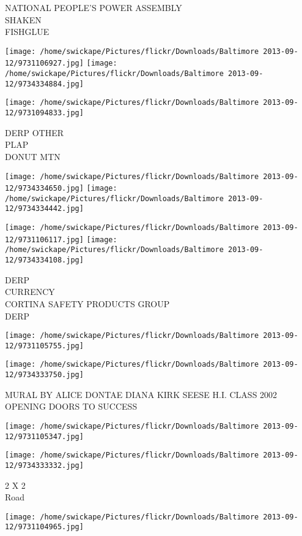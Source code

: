 \documentclass[10pt,letterpaper]{article}
\begin{document}
NATIONAL PEOPLE'S POWER ASSEMBLY\\
SHAKEN\\
FISHGLUE
\pagebreak

\texttt{[image: /home/swickape/Pictures/flickr/Downloads/Baltimore 2013-09-12/9731106927.jpg]}
\texttt{[image: /home/swickape/Pictures/flickr/Downloads/Baltimore 2013-09-12/9734334884.jpg]}

\vspace{0.25in}
\texttt{[image: /home/swickape/Pictures/flickr/Downloads/Baltimore 2013-09-12/9731094833.jpg]}

DERP OTHER\\
PLAP\\
DONUT MTN
\pagebreak

\texttt{[image: /home/swickape/Pictures/flickr/Downloads/Baltimore 2013-09-12/9734334650.jpg]}
\texttt{[image: /home/swickape/Pictures/flickr/Downloads/Baltimore 2013-09-12/9734334442.jpg]}

\texttt{[image: /home/swickape/Pictures/flickr/Downloads/Baltimore 2013-09-12/9731106117.jpg]}
\texttt{[image: /home/swickape/Pictures/flickr/Downloads/Baltimore 2013-09-12/9734334108.jpg]}

DERP\\
CURRENCY\\
CORTINA SAFETY PRODUCTS GROUP\\
DERP
\pagebreak

\texttt{[image: /home/swickape/Pictures/flickr/Downloads/Baltimore 2013-09-12/9731105755.jpg]}

\vspace{0.25in}
\texttt{[image: /home/swickape/Pictures/flickr/Downloads/Baltimore 2013-09-12/9734333750.jpg]}

MURAL BY ALICE DONTAE DIANA KIRK SEESE H.I. CLASS 2002\\
OPENING DOORS TO SUCCESS
\pagebreak

\texttt{[image: /home/swickape/Pictures/flickr/Downloads/Baltimore 2013-09-12/9731105347.jpg]}

\vspace{0.25in}
\texttt{[image: /home/swickape/Pictures/flickr/Downloads/Baltimore 2013-09-12/9734333332.jpg]}

2 X 2\\
Road
\pagebreak

\texttt{[image: /home/swickape/Pictures/flickr/Downloads/Baltimore 2013-09-12/9731104965.jpg]}
\end{document}
